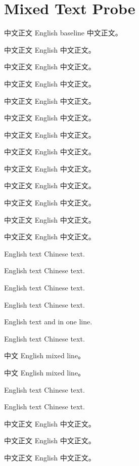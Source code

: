 \documentclass[UTF8,zihao=-4,a4paper,fontset=none]{ctexart}
\begin{document}
\section*{Mixed Text Probe}

中文正文 English baseline 中文正文。

中文正文  English 中文正文。

中文正文  English 中文正文。

中文正文  English 中文正文。

中文正文  English 中文正文。

中文正文  English 中文正文。

中文正文  English 中文正文。

中文正文  English 中文正文。

中文正文  English 中文正文。

中文正文  English 中文正文。

中文正文  English 中文正文。

中文正文  English 中文正文。

中文正文  English 中文正文。

\bigskip

English text  Chinese text.

English text  Chinese text.

English text  Chinese text.

English text  Chinese text.

English text  and  in one line.

English text  Chinese text.

\bigskip

中文 English  mixed  line。

中文 English  mixed  line。

\bigskip

English text  Chinese text.

English text  Chinese text.

中文正文  English 中文正文。

中文正文  English 中文正文。

中文正文  English 中文正文。
\end{document}
